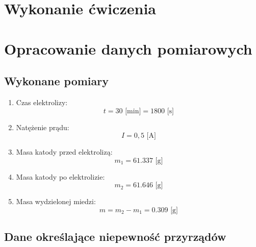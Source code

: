 \documentclass[a4paper,12pts]{article}
\begin{document}
	\section{Wykonanie ćwiczenia}
	

	\section{Opracowanie danych pomiarowych}
	
	\subsection{Wykonane pomiary}
	
	\begin{enumerate}
		\item Czas elektrolizy:
		\begin{equation}
		t = 30 \textrm{ [min]} = 1800 \textrm{ [s]}
		\end{equation}
		
		\item Natężenie prądu:
		\begin{equation}
		I = 0,5 \textrm{ [A]}
		\end{equation}
		
		\item Masa katody przed elektrolizą:
		\begin{equation}
		m_{1} = 61.337 \textrm{ [g]}
		\end{equation}
		
		\item Masa katody po elektrolizie:
		\begin{equation}
		m_{2} = 61.646 \textrm{ [g]}
		\end{equation}
		
		\item Masa wydzielonej miedzi:
		\begin{equation}
		m = m_{2} - m_{1} = 0.309 \textrm{ [g]}
		\end{equation}
	\end{enumerate}

	
	\subsection{Dane określające niepewność przyrządów}
	
\end{document}
